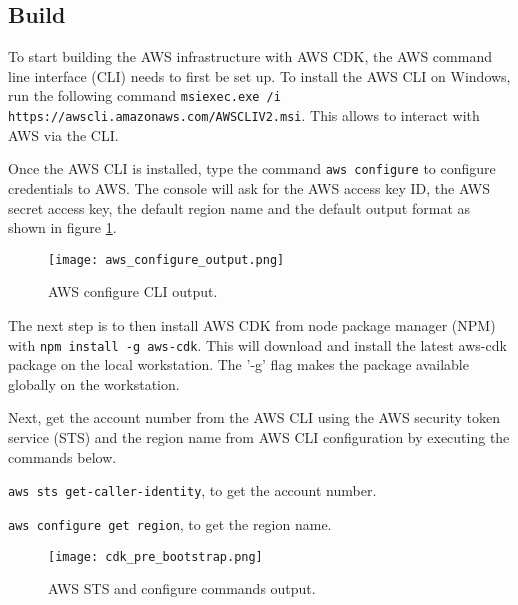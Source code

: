 


\subsection*{Build}
\label{subsec:build}

To start building the AWS infrastructure with AWS CDK, the AWS command line interface (CLI) needs to first be set up. To install the AWS CLI on Windows, run the following command \texttt{msiexec.exe /i https://awscli.amazonaws.com/AWSCLIV2.msi}. This allows to interact with AWS via the CLI.

Once the AWS CLI is installed, type the command \texttt{aws configure} to configure credentials to AWS. The console will ask for the AWS access key ID, the AWS secret access key, the default region name and the default output format as shown in figure \ref{fig:aws-configure-output}.

\begin{figure}[H]
    \centering \texttt{[image: aws\_configure\_output.png]}
    \caption{AWS configure CLI output.}
    \label{fig:aws-configure-output}
\end{figure}

The next step is to then install AWS CDK from node package manager (NPM) with \texttt{npm install -g aws-cdk}. This will download and install the latest aws-cdk package on the local workstation. The '-g' flag makes the package available globally on the workstation.

Next, get the account number from the AWS CLI using the AWS security token service (STS) and the region name from AWS CLI configuration by executing the commands below.

\texttt{aws sts get-caller-identity}, to get the account number.

\texttt{aws configure get region}, to get the region name.

\begin{figure}[H]
    \centering \texttt{[image: cdk\_pre\_bootstrap.png]}
    \caption{AWS STS and configure commands output.}
    \label{fig:aws-account-numbre-region}
\end{figure}

